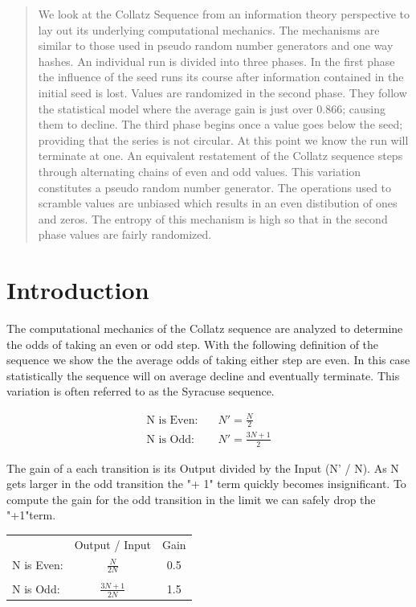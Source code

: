\documentclass[preprint,natbib]{sigplanconf}
\begin{document}
\begin{abstract}
    We look at the Collatz Sequence from an information theory perspective to lay out its underlying computational mechanics. The mechanisms are similar to those used in pseudo random number generators and one way hashes.
    An individual run is divided into three phases.  In the first phase the influence of the seed runs its course after information contained in the initial seed is lost.  Values are randomized in the second phase.  They follow the statistical model where the average gain is just over 0.866; causing them to decline.  The third phase begins once a value goes below the seed; providing that the series is not circular.  At this point we know the run will terminate at one.
    An equivalent restatement of the Collatz sequence steps through alternating chains of even and odd values.  This variation constitutes a pseudo random number generator.  The operations used to scramble values are unbiased which results in an even distibution of ones and zeros.  The entropy of this mechanism is high so that in the second phase values are fairly randomized.
\end{abstract}

\section{Introduction}


The computational mechanics of the Collatz sequence are analyzed to determine the odds of taking an even or odd step. With the following definition of the sequence we show the the average odds of taking either step are even. In this case statistically the sequence will on average decline and eventually terminate. This variation is often referred to as the Syracuse sequence.

\begin{align*}
    \text{N is Even:} & \quad N' = \frac{N}{2}      \\
    \text{N is Odd:}  & \quad N' = \frac{3N + 1}{2}
\end{align*}

The gain of a each transition is its Output divided by the Input (N' / N). As N gets larger in the odd transition the "+ 1" term quickly becomes insignificant. To compute the gain for the odd transition in the limit we can safely drop the "+1"term.

\begin{center}
    \begin{tabular}{l c c}
                   & Output / Input      & Gain \\
        N is Even: & $\frac{N}{2N}$      & 0.5  \\
                   &                     &      \\
        N is Odd:  & $\frac{3N + 1}{2N}$ & 1.5
    \end{tabular}
\end{center}
\end{document}
